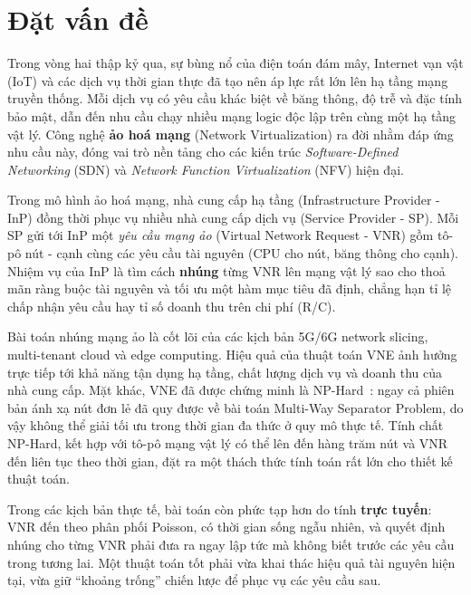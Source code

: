 \documentclass[../DoAn.tex]{subfiles}
\begin{document}
\label{ch:mo_dau}

\section{Đặt vấn đề}
\label{sec:dat-van-de}

Trong vòng hai thập kỷ qua, sự bùng nổ của điện toán đám mây, Internet vạn vật (IoT) và các dịch vụ thời gian thực đã tạo nên áp lực rất lớn lên hạ tầng mạng truyền thống. Mỗi dịch vụ có yêu cầu khác biệt về băng thông, độ trễ và đặc tính bảo mật, dẫn đến nhu cầu chạy nhiều mạng logic độc lập trên cùng một hạ tầng vật lý. Công nghệ \textbf{ảo hoá mạng} (Network Virtualization) ra đời nhằm đáp ứng nhu cầu này, đóng vai trò nền tảng cho các kiến trúc \textit{Software-Defined Networking} (SDN) và \textit{Network Function Virtualization} (NFV) hiện đại\cite{peterson2007computer,kreutz2015sdn_survey,mijumbi2016nfv_survey}.

Trong mô hình ảo hoá mạng, nhà cung cấp hạ tầng (Infrastructure Provider - InP) đồng thời phục vụ nhiều nhà cung cấp dịch vụ (Service Provider - SP). Mỗi SP gửi tới InP một \textit{yêu cầu mạng ảo} (Virtual Network Request - VNR) gồm tô-pô nút - cạnh cùng các yêu cầu tài nguyên (CPU cho nút, băng thông cho cạnh). Nhiệm vụ của InP là tìm cách \textbf{nhúng} từng VNR lên mạng vật lý sao cho thoả mãn ràng buộc tài nguyên và tối ưu một hàm mục tiêu đã định, chẳng hạn tỉ lệ chấp nhận yêu cầu hay tỉ số doanh thu trên chi phí (R/C)\cite{fischer2013vne_survey,cao2019vne_survey}.

Bài toán nhúng mạng ảo là cốt lõi của các kịch bản 5G/6G network slicing, multi-tenant cloud và edge computing. Hiệu quả của thuật toán VNE ảnh hưởng trực tiếp tới khả năng tận dụng hạ tầng, chất lượng dịch vụ và doanh thu của nhà cung cấp. Mặt khác, VNE đã được chứng minh là NP-Hard~\cite{chowdhury2009vine}: ngay cả phiên bản ánh xạ nút đơn lẻ đã quy được về bài toán Multi-Way Separator Problem, do vậy không thể giải tối ưu trong thời gian đa thức ở quy mô thực tế. Tính chất NP-Hard, kết hợp với tô-pô mạng vật lý có thể lên đến hàng trăm nút và VNR đến liên tục theo thời gian, đặt ra một thách thức tính toán rất lớn cho thiết kế thuật toán.

Trong các kịch bản thực tế, bài toán còn phức tạp hơn do tính \textbf{trực tuyến}: VNR đến theo phân phối Poisson, có thời gian sống ngẫu nhiên, và quyết định nhúng cho từng VNR phải đưa ra ngay lập tức mà không biết trước các yêu cầu trong tương lai. Một thuật toán tốt phải vừa khai thác hiệu quả tài nguyên hiện tại, vừa giữ ``khoảng trống'' chiến lược để phục vụ các yêu cầu sau.
\end{document}
